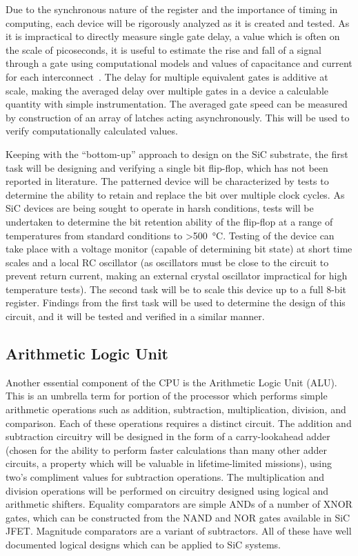 \documentclass[12pt]{amsart}
\begin{document}
 	
 	Due to the synchronous nature of the register and the importance of timing in computing, each device will be rigorously analyzed as it is created and tested.  As it is impractical to directly measure single gate delay, a value which is often on the scale of picoseconds, it is useful to estimate the rise and fall of a signal through a gate using computational models and values of capacitance and current for each interconnect~\cite{kaushik_waveform_2007}.  The delay for multiple equivalent gates is additive at scale, making the averaged delay over multiple gates in a device a calculable quantity with simple instrumentation.  The averaged gate speed can be measured by construction of an array of latches acting asynchronously.  This will be used to verify computationally calculated values. 
 	
 	Keeping with the ``bottom-up'' approach to design on the SiC substrate, the first task will be designing and verifying a single bit flip-flop, which has not been reported in literature.  The patterned device will be characterized by tests to determine the ability to retain and replace the bit over multiple clock cycles.  As SiC devices are being sought to operate in harsh conditions, tests will be undertaken to determine the bit retention ability of the flip-flop at a range of temperatures from standard conditions to \textgreater\SI{500}{\degreeCelsius}.  Testing of the device can take place with a voltage monitor (capable of determining bit state) at short time scales and a local RC oscillator (as oscillators must be close to the circuit to prevent return current, making an external crystal oscillator impractical for high temperature tests).  The second task will be to scale this device up to a full 8-bit register.  Findings from the first task will be used to determine the design of this circuit, and it will be tested and verified in a similar manner.
 	
 	\subsection{Arithmetic Logic Unit}
 	
	Another essential component of the CPU is the Arithmetic Logic Unit (ALU).  This is an umbrella term for portion of the processor which performs simple arithmetic operations such as addition, subtraction, multiplication, division, and comparison.  Each of these operations requires a distinct circuit.  The addition and subtraction circuitry will be designed in the form of a carry-lookahead adder (chosen for the ability to perform faster calculations than many other adder circuits, a property which will be valuable in lifetime-limited missions), using two's compliment values for subtraction operations.  The multiplication and division operations will be performed on circuitry designed using logical and arithmetic shifters.  Equality comparators are simple ANDs of a number of XNOR gates, which can be constructed from the NAND and NOR gates available in SiC JFET.  Magnitude comparators are a variant of subtractors.  All of these have well documented logical designs which can be applied to SiC systems.
	
\end{document}
